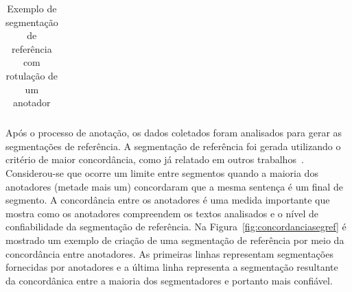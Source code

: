 \begin{table}[!h]
\begin{tabular}{|p{0.2cm}p{}|}







	\end{tabular}
	\caption{Exemplo de segmentação de referência com rotulação de um anotador}
	\label{tab:segmentacaoreferencia}
\end{table}









  
  Após o processo de anotação, os dados coletados foram analisados para gerar as segmentações de referência. A segmentação de referência foi gerada utilizando o critério de maior concordância, como já relatado em outros trabalhos~\cite{Hearst1997, Cardoso2017, Kazantseva2012, Passonneau1997, Galley2003}. Considerou-se que ocorre um limite entre segmentos quando a maioria dos anotadores (metade mais um) concordaram que a mesma sentença é um final de segmento. A concordância entre os anotadores é uma medida importante que mostra como os anotadores compreendem os textos analisados e o nível de confiabilidade da segmentação de referência. Na Figura~\ref{fig:concordanciasegref} é mostrado um exemplo de criação de uma segmentação de referência por meio da concordância entre anotadores. As primeiras linhas representam segmentações fornecidas por anotadores e a última linha representa a segmentação resultante da concordânica entre a maioria dos segmentadores e portanto mais confiável. 

